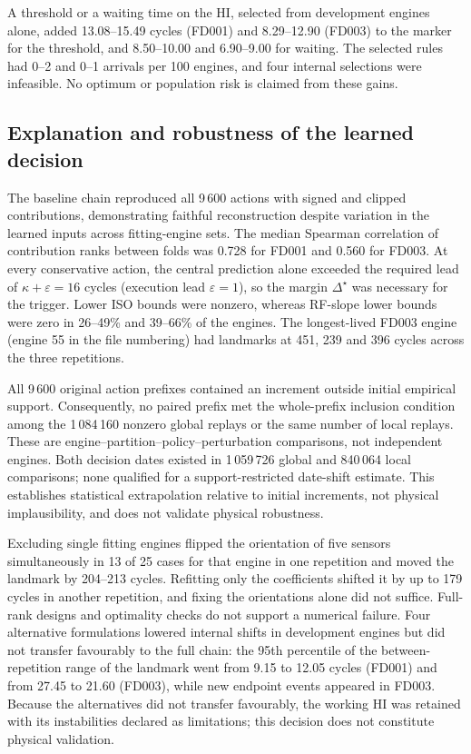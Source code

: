\documentclass[preprint,12pt]{elsarticle}
\begin{document}
A threshold or a waiting time on the HI, selected from development engines alone, added 13.08--15.49 cycles (FD001) and 8.29--12.90 (FD003) to the marker for the threshold, and 8.50--10.00 and 6.90--9.00 for waiting. The selected rules had 0--2 and 0--1 arrivals per 100 engines, and four internal selections were infeasible. No optimum or population risk is claimed from these gains.

\subsection{Explanation and robustness of the learned decision}\label{sec:explanation-results}

The baseline chain reproduced all 9\,600 actions with signed and clipped contributions, demonstrating faithful reconstruction despite variation in the learned inputs across fitting-engine sets. The median Spearman correlation of contribution ranks between folds was 0.728 for FD001 and 0.560 for FD003. At every conservative action, the central prediction alone exceeded the required lead of $\kappa+\varepsilon=16$ cycles (execution lead $\varepsilon=1$), so the margin $\Delta^{\star}$ was necessary for the trigger. Lower ISO bounds were nonzero, whereas RF-slope lower bounds were zero in 26--49\% and 39--66\% of the engines. The longest-lived FD003 engine (engine 55 in the file numbering) had landmarks at 451, 239 and 396 cycles across the three repetitions.

All 9\,600 original action prefixes contained an increment outside initial empirical support. Consequently, no paired prefix met the whole-prefix inclusion condition among the 1\,084\,160 nonzero global replays or the same number of local replays. These are engine--partition--policy--perturbation comparisons, not independent engines. Both decision dates existed in 1\,059\,726 global and 840\,064 local comparisons; none qualified for a support-restricted date-shift estimate. This establishes statistical extrapolation relative to initial increments, not physical implausibility, and does not validate physical robustness.

Excluding single fitting engines flipped the orientation of five sensors simultaneously in 13 of 25 cases for that engine in one repetition and moved the landmark by 204--213 cycles. Refitting only the coefficients shifted it by up to 179 cycles in another repetition, and fixing the orientations alone did not suffice. Full-rank designs and optimality checks do not support a numerical failure. Four alternative formulations lowered internal shifts in development engines but did not transfer favourably to the full chain: the 95th percentile of the between-repetition range of the landmark went from 9.15 to 12.05 cycles (FD001) and from 27.45 to 21.60 (FD003), while new endpoint events appeared in FD003. Because the alternatives did not transfer favourably, the working HI was retained with its instabilities declared as limitations; this decision does not constitute physical validation.
\end{document}
